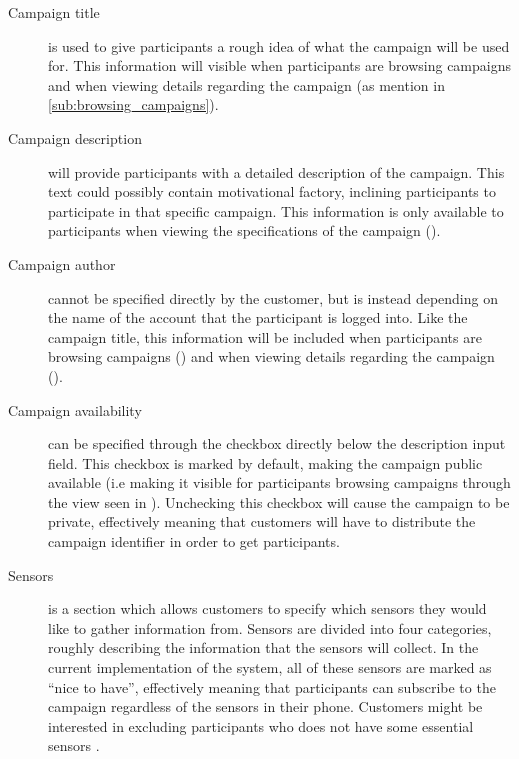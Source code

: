 \begin{description}
    \item[Campaign title] is used to give participants a rough idea of what the campaign will be used for. This information will visible when participants are browsing campaigns and when viewing details regarding the campaign (as mention in \ref{sub:browsing_campaigns}).

    \item[Campaign description] will provide participants with a detailed description of the campaign. This text could possibly contain motivational factory, inclining participants to participate in that specific campaign. This information is only available to participants when viewing the specifications of the campaign ().

    \item[Campaign author] cannot be specified directly by the customer, but is instead depending on the name of the account that the participant is logged into. Like the campaign title, this information will be included when participants are browsing campaigns () and when viewing details regarding the campaign ().

    \item[Campaign availability] can be specified through the checkbox directly below the description input field. This checkbox is marked by default, making the campaign public available (i.e making it visible for participants browsing campaigns through the view seen in ). Unchecking this checkbox will cause the campaign to be private, effectively meaning that customers will have to distribute the campaign identifier in order to get participants.

    \item[Sensors] is a section which allows customers to specify which sensors they would like to gather information from. Sensors are divided into four categories, roughly describing the information that the sensors will collect. In the current implementation of the system, all of these sensors are marked as ``nice to have'', effectively meaning that participants can subscribe to the campaign regardless of the sensors in their phone. Customers might be interested in excluding participants who does not have some essential sensors . 


\end{description}
